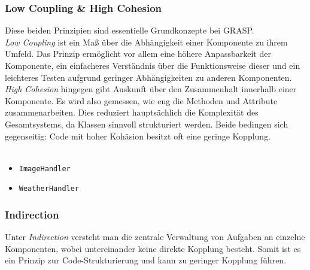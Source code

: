 \subsubsection{Low Coupling \& High Cohesion}
Diese beiden Prinzipien sind essentielle Grundkonzepte bei GRASP.\\
\textit{Low Coupling} ist ein Maß über die Abhängigkeit einer Komponente zu ihrem Umfeld.
Das Prinzip ermöglicht vor allem eine höhere Anpassbarkeit der Komponente, ein einfacheres Verständnis über die Funktionsweise dieser und ein leichteres Testen aufgrund geringer Abhängigkeiten zu anderen Komponenten.\\
\textit{High Cohesion} hingegen gibt Auskunft über den Zusammenhalt innerhalb einer Komponente.
Es wird also gemessen, wie eng die Methoden und Attribute zusammenarbeiten.
Dies reduziert hauptsächlich die Komplexität des Gesamtsystems, da Klassen sinnvoll strukturiert werden.
Beide bedingen sich gegenseitig: Code mit hoher Kohäsion besitzt oft eine geringe Kopplung.\\
\\
\begin{itemize}
	\item \texttt{ImageHandler}		
	\item \texttt{WeatherHandler}	%
\end{itemize}


\subsubsection{Indirection}
Unter \textit{Indirection} versteht man die zentrale Verwaltung von Aufgaben an einzelne Komponenten, wobei untereinander keine direkte Kopplung besteht.
Somit ist es ein Prinzip zur Code-Strukturierung und kann zu geringer Kopplung führen.


